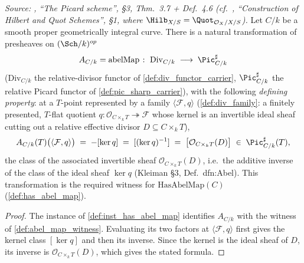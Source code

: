 \begin{lemma}\leanok
  \label{lem:line_bundle_quot_correspondence}
  \textit{Source: \cite{kleiman-picard}, ``The Picard scheme'', \S 3,
  Thm.~3.7 + Def.~4.6 (cf.\ \cite{nitsure-hilbert-quot}, ``Construction of Hilbert
  and Quot Schemes'', \S 1, where \(\Hilb_{X/S} = \Quot_{\mathcal{O}_X/X/S}\)).}
  Let \(C/k\) be a smooth proper geometrically integral curve. There is a
  natural transformation of presheaves on \((\Sch/k)^{op}\)
  \[
    A_{C/k} = \mathrm{abelMap} \;\colon\; \mathrm{Div}_{C/k}
      \;\longrightarrow\; \Pic^\sharp_{C/k}
  \]
  (\(\mathrm{Div}_{C/k}\) the relative-divisor functor of
  \cref{def:div_functor_carrier}, \(\Pic^\sharp_{C/k}\) the relative
  Picard functor of \cref{def:pic_sharp_carrier}), with the following
  \emph{defining property}: at a \(T\)-point represented by a family
  \(\langle \mathcal F, q\rangle\) (\cref{def:div_family}: a finitely
  presented, \(T\)-flat quotient
  \(q \colon \mathcal O_{C\times_kT}\twoheadrightarrow\mathcal F\)
  whose kernel is an invertible ideal sheaf cutting out a relative effective
  divisor \(D\subseteq C\times_kT\)),
  \[
    A_{C/k}(T)\bigl(\langle \mathcal F, q\rangle\bigr)
      \;=\; -[\ker q] \;=\; [(\ker q)^{-1}]
      \;=\; \bigl[\mathcal{O}_{C \times_k T}(D)\bigr]
      \;\in\; \Pic^\sharp_{C/k}(T),
  \]
  the class of the associated invertible sheaf \(\mathcal{O}_{C \times_k
  T}(D)\), i.e.\ the additive inverse of the class of the ideal sheaf
  \(\ker q\) (Kleiman \S 3, Def.~dfn:Abel). This transformation is the
  required witness for \(\mathrm{HasAbelMap}(C)\)
  (\cref{def:has_abel_map}).
\end{lemma}

\begin{proof}
  The instance of \cref{def:inst_has_abel_map} identifies
  \(A_{C/k}\) with the witness of \cref{def:abel_map_witness}. Evaluating its
  two factors at \(\langle \mathcal F,q\rangle\) first gives the kernel class
  \([\ker q]\) and then its inverse. Since the kernel is the ideal sheaf of
  \(D\), its inverse is \(\mathcal O_{C\times_kT}(D)\), which gives the stated
  formula.
\end{proof}

